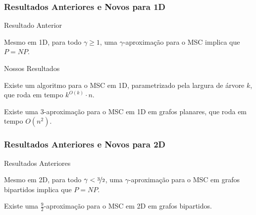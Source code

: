 \subsubsection{Resultados Anteriores e Novos para 1D}

\begin{frame}{Resultado Anterior}
  \begin{thm}
    Mesmo em 1D, para todo $\gamma \geq 1$, uma $\gamma$-aproximação para o MSC implica que $P = NP$.
  \end{thm}
\end{frame}

\begin{frame}{Nossos Resultados}
  \begin{thm}
    Existe um algoritmo \FPT para o MSC em 1D, parametrizado pela largura de árvore $k$, que roda em tempo $k^{O(k)} \cdot n$.
  \end{thm}

  \pause
  \begin{cor}
    Existe uma $3$-aproximação para o MSC em 1D em grafos planares, que roda em tempo $O(n^2)$.
  \end{cor}
\end{frame}


\subsubsection{Resultados Anteriores e Novos para 2D}

\begin{frame}{Resultados Anteriores}
  \begin{thm}
    Mesmo em 2D, para todo $\gamma < \nicefrac{3}{2}$, uma $\gamma$-aproximação para o MSC em grafos bipartidos implica que $P = NP$.
  \end{thm}

  \pause
  \begin{thm}
    Existe uma $\frac{9}{2}$-aproximação para o MSC em 2D em grafos bipartidos.
  \end{thm}
\end{frame}

